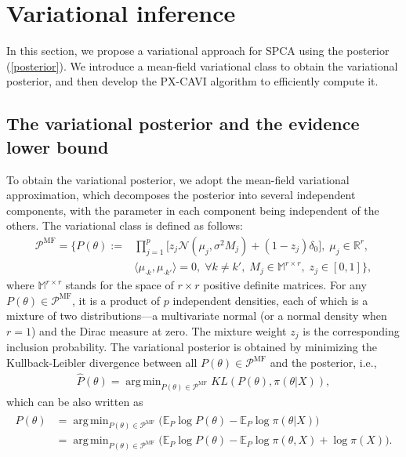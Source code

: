 \documentclass[pdftex, noinfoline, letter]{imsart}
\DeclareMathOperator{\MF}{\text{MF}}
\DeclareMathOperator*{\argmin}{arg\,min}
\theoremstyle{plain}
\begin{document}
\section{Variational inference}
\label{sec:VI}

In this section, we propose a variational approach for SPCA using the posterior (\ref{posterior}). We introduce a mean-field variational class to obtain the variational posterior, and then develop the PX-CAVI algorithm to efficiently compute it.

\subsection{The variational posterior and the evidence lower bound}

To obtain the variational posterior, we adopt the mean-field variational approximation, which decomposes the posterior into several independent components, with the parameter in each component being independent of the others.
The variational class is defined as follows:
\begin{equation}
\begin{split}
\label{eqn:MF-class}
\mathcal{P}^{\text{MF}} = 
\Bigg\{
P(\theta):= 
& \prod_{j=1}^p \Big[
z_j \mathcal{N}(\mu_j, \sigma^2 M_j) + 
(1 - z_j) \delta_0
\Big],\; \mu_j \in \mathbb{R}^{r},\\
& \langle \mu_{\cdot k}, \mu_{\cdot k'} \rangle = 0, \;\forall k \neq k', \;
M_j \in \mathbb{M}^{r \times r},\;
z_j \in [0, 1]
\Bigg\},
\end{split}
\end{equation}
where $\mathbb{M}^{r \times r}$ stands for the space of $r \times r$ positive definite matrices. 
For any $P(\theta) \in \mathcal{P}^{\MF}$, it is a product of $p$ independent densities, each of which is a mixture of two distributions---a multivariate normal (or a normal density when $r = 1$) and the Dirac measure at zero. The mixture weight $z_j$ is the corresponding inclusion probability.
The variational posterior is obtained by minimizing the Kullback-Leibler divergence between all $P(\theta) \in \mathcal{P}^{\text{MF}}$ and the posterior, i.e.,
\begin{align}
\label{eqn:MF-posterior}
    \widehat  P(\theta) = \argmin_{P(\theta) \in \mathcal{P}^{\text{MF}}}
    KL\left(P(\theta), \pi(\theta|X)\right),
\end{align}
which can be also written as
\begin{align}
    \widehat P(\theta) 
    & = 
    \argmin_{P(\theta) \in \mathcal{P}^{\text{MF}}}
    \Big(\mathbb{E}_P \log P(\theta) - \mathbb{E}_P \log\pi(\theta|X)\Big) \nonumber \\
    & =
    \argmin_{P(\theta) \in \mathcal{P}^{\text{MF}}}
    \Big(
        \mathbb{E}_P \log P(\theta) - \mathbb{E}_P \log\pi(\theta, X)
        + \log \pi(X)
    \Big).
    \label{eqn:VP-1}
\end{align}
\end{document}
